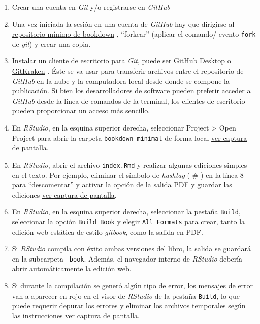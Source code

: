 \documentclass[
]{book}
\begin{document}
\begin{enumerate}
\def\labelenumi{\arabic{enumi}.}
\item
  Crear una cuenta en \emph{Git} y/o registrarse en \emph{GitHub}
\item
  Una vez iniciada la sesión en una cuenta de \emph{GitHub} hay que dirigirse al \href{https://github.com/yihui/bookdown-minimal}{repositorio mínimo de bookdown} , ``forkear'' (aplicar el comando/ evento \texttt{fork} de \emph{git}) y crear una copia.
\item
  Instalar un cliente de escritorio para \emph{Git}, puede ser \href{https://desktop.github.com}{GitHub Desktop} o \href{https://www.gitkraken.com/}{GitKraken} . Éste se va usar para transferir archivos entre el repositorio de \emph{GitHub} en la nube y la computadora local desde donde se compone la publicación. Si bien los desarrolladores de software pueden preferir acceder a \emph{GitHub} desde la línea de comandos de la terminal, los clientes de escritorio pueden proporcionar un acceso más sencillo.
\item
  En \emph{RStudio}, en la esquina superior derecha, seleccionar Project \textgreater{} Open Project para abrir la carpeta \texttt{bookdown-minimal} de forma local \href{images/project-open.png}{ver captura de pantalla}.
\item
  En \emph{RStudio}, abrir el archivo \texttt{index.Rmd} y realizar algunas ediciones simples en el texto. Por ejemplo, eliminar el símbolo de \emph{hashtag} ( \# ) en la línea 8 para ``descomentar'' y activar la opción de la salida PDF y guardar las ediciones \href{images/edit-book.png}{ver captura de pantalla}.
\item
  En \emph{RStudio}, en la esquina superior derecha, seleccionar la pestaña \texttt{Build}, seleccionar la opción \texttt{Build\ Book} y elegir \texttt{All\ Formats} para crear, tanto la edición web estática de estilo \emph{gitbook}, como la salida en PDF.
\item
  Si \emph{RStudio} compila con éxito ambas versiones del libro, la salida se guardará en la subcarpeta \texttt{\_book}. Además, el navegador interno de \emph{RStudio} debería abrir automáticamente la edición web.
\item
  Si durante la compilación se generó algún tipo de error, los mensajes de error van a aparecer en rojo en el visor de \emph{RStudio} de la pestaña \texttt{Build}, lo que puede requerir depurar los errores y eliminar los archivos temporales según las instrucciones \href{images/build-book.png}{ver captura de pantalla}.
\end{enumerate}
\end{document}

